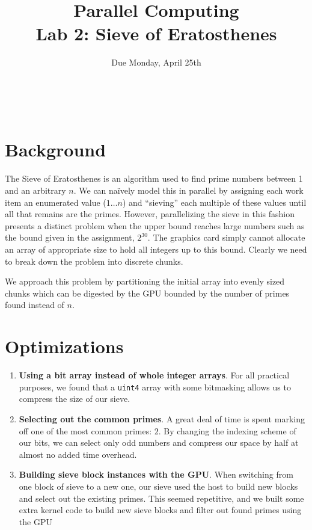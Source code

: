 \documentclass[12pt]{article}
\title{ Parallel Computing \\ Lab 2: Sieve of Eratosthenes }
\author{\MyFullName}
\date{ Due Monday, April 25th }
\begin{document}
\maketitle
\thispagestyle{empty}
\begin{center}
\end{center}
\setcounter{page}{0}
\newpage

\def\thesection{\Roman{section}.}
\hfill \\
\section{ Background }

\paragraph{}The Sieve of Eratosthenes is an algorithm used to find prime numbers between 1 and an arbitrary $n$. 
We can naïvely model this in parallel by assigning each work item an enumerated value ($1\ldots n$) and ``sieving'' each multiple of these values until all that remains are the primes. 
However, parallelizing the sieve in this fashion presents a distinct problem when the upper bound reaches large numbers such as the bound given in the assignment, $2^{30}$.
The graphics card simply cannot allocate an array of appropriate size to hold all integers up to this bound. 
Clearly we need to break down the problem into discrete chunks.

We approach this problem by partitioning the initial array into evenly sized chunks which can be digested by the GPU bounded by the number of primes found instead of $n$. 

\section{ Optimizations }
\begin{enumerate}[1.]
\item \textbf{Using a bit array instead of whole integer arrays}. For all practical purposes, we found that a \texttt{uint4} array with some bitmasking allows us to compress the size of our sieve.

\item \textbf{Selecting out the common primes}. A great deal of time is spent marking off one of the most common primes: $2$. By changing the indexing scheme of our bits, we can select only odd numbers and compress our space by half at almost no added time overhead.

\item \textbf{Building sieve block instances with the GPU}. When switching from one block of sieve to a new one, our sieve used the host to build new blocks and select out the existing primes. This seemed repetitive, and we built some extra kernel code to build new sieve blocks and filter out found primes using the GPU
\end{enumerate}
\end{document}

